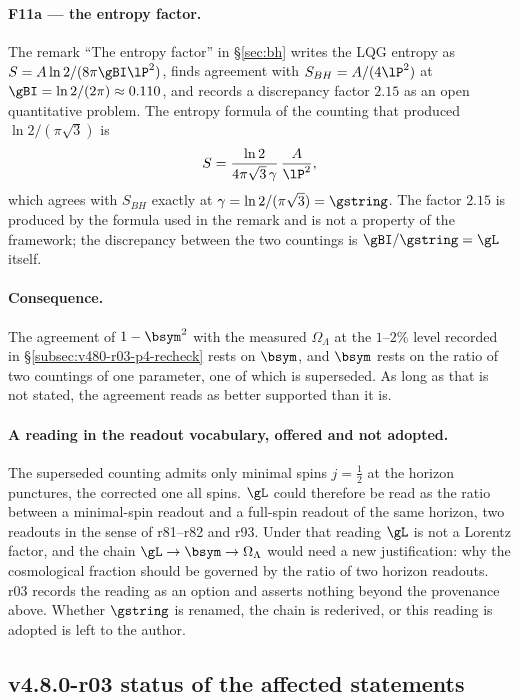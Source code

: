\paragraph{F11a --- the entropy factor.}
The remark ``The entropy factor'' in \S\ref{sec:bh} writes the LQG entropy as
\(S=A\ln2/(8\pi\gBI\lP^2)\), finds agreement with \(S_{BH}=A/(4\lP^2)\) at
\(\gBI=\ln2/(2\pi)\approx0.110\), and records a discrepancy factor \(2.15\) as an open quantitative
problem.  The entropy formula of the counting that produced \(\ln2/(\pi\sqrt3)\) is
\[
S=\frac{\ln2}{4\pi\sqrt3\,\gamma}\,\frac{A}{\lP^2},
\]
which agrees with \(S_{BH}\) exactly at \(\gamma=\ln2/(\pi\sqrt3)=\gstring\).  The factor \(2.15\)
is produced by the formula used in the remark and is not a property of the framework; the
discrepancy between the two countings is \(\gBI/\gstring=\gL\) itself.

\paragraph{Consequence.}
The agreement of \(1-\bsym^2\) with the measured \(\Omega_\Lambda\) at the \(1\)--\(2\%\) level
recorded in \S\ref{subsec:v480-r03-p4-recheck} rests on \(\bsym\), and \(\bsym\) rests on the ratio
of two countings of one parameter, one of which is superseded.  As long as that is not stated,
the agreement reads as better supported than it is.

\paragraph{A reading in the readout vocabulary, offered and not adopted.}
The superseded counting admits only minimal spins \(j=\tfrac12\) at the horizon punctures, the
corrected one all spins.  \(\gL\) could therefore be read as the ratio between a minimal-spin
readout and a full-spin readout of the same horizon, two readouts in the sense of r81--r82 and
r93.  Under that reading \(\gL\) is not a Lorentz factor, and the chain
\(\gL\to\bsym\to\Omega_\Lambda\) would need a new justification: why the cosmological fraction
should be governed by the ratio of two horizon readouts.  r03 records the reading as an option
and asserts nothing beyond the provenance above.  Whether \(\gstring\) is renamed, the chain is
rederived, or this reading is adopted is left to the author.

\subsection*{v4.8.0-r03 status of the affected statements}
\label{subsec:v480-r03-status}

